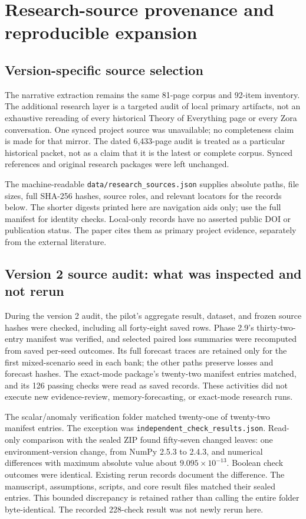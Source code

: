\section{Research-source provenance and reproducible expansion}
\label{app:research-provenance}
\subsection{Version-specific source selection}
The narrative extraction remains the same 81-page corpus and 92-item inventory. The additional research layer is a targeted audit of local primary artifacts, not an exhaustive rereading of every historical Theory of Everything page or every Zora conversation. One synced project source was unavailable; no completeness claim is made for that mirror. The dated 6,433-page audit is treated as a particular historical packet, not as a claim that it is the latest or complete corpus. Synced references and original research packages were left unchanged.

The machine-readable \texttt{data/research\_sources.json} supplies absolute paths, file sizes, full SHA-256 hashes, source roles, and relevant locators for the records below. The shorter digests printed here are navigation aids only; use the full manifest for identity checks. Local-only records have no asserted public DOI or publication status. The paper cites them as primary project evidence, separately from the external literature.



\subsection{Version 2 source audit: what was inspected and not rerun}
During the version 2 audit, the pilot's aggregate result, dataset, and frozen source hashes were checked, including all forty-eight saved rows. Phase 2.9's thirty-two-entry manifest was verified, and selected paired loss summaries were recomputed from saved per-seed outcomes. Its full forecast traces are retained only for the first mixed-scenario seed in each bank; the other paths preserve losses and forecast hashes. The exact-mode package's twenty-two manifest entries matched, and its 126 passing checks were read as saved records. These activities did not execute new evidence-review, memory-forecasting, or exact-mode research runs.

The scalar/anomaly verification folder matched twenty-one of twenty-two manifest entries. The exception was \texttt{independent\_check\_results.json}. Read-only comparison with the sealed ZIP found fifty-seven changed leaves: one environment-version change, from NumPy 2.5.3 to 2.4.3, and numerical differences with maximum absolute value about $9.095\times10^{-13}$. Boolean check outcomes were identical. Existing rerun records document the difference. The manuscript, assumptions, scripts, and core result files matched their sealed entries. This bounded discrepancy is retained rather than calling the entire folder byte-identical. The recorded 228-check result was not newly rerun here.


